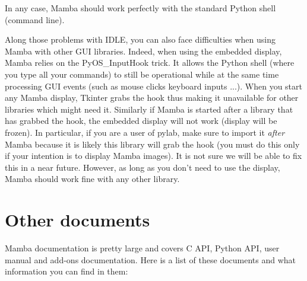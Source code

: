 \documentclass[a4paper,10pt,oneside]{article}
\begin{document}
In any case, Mamba should work perfectly with the standard Python shell 
(command line).

Along those problems with IDLE, you can also face difficulties when using
Mamba with other GUI libraries. Indeed, when using the embedded display,
Mamba relies on the PyOS\_InputHook trick. It allows the Python shell (where 
you type all your commands) to still be operational while at the same time
processing GUI events (such as mouse clicks keyboard inputs ...). When you
start any Mamba display, Tkinter grabs the hook thus making it unavailable
for other libraries which might need it. Similarly if Mamba is started
after a library that has grabbed the hook, the embedded display will not
work (display will be frozen). In particular, if you are a user of pylab,
make sure to import it \textit{after} Mamba because it is likely
this library will grab the hook (you must do this only if your intention is to
display Mamba images). It is not sure we will be able to fix this in a near
future. However, as long as you don't need to use the display, Mamba should 
work fine with any other library.

\pagebreak

\section{Other documents}
\label{cha:other_docs}

Mamba documentation is pretty large and covers C API, Python API, user manual 
and add-ons documentation. Here is a list of these documents and what 
information you can find in them:
\end{document}
